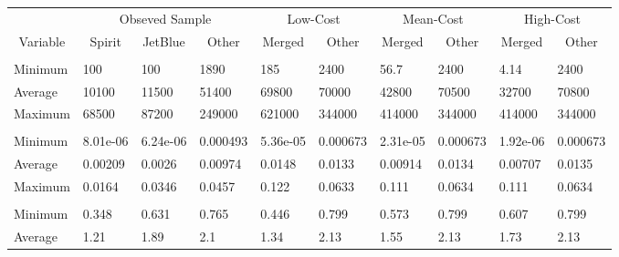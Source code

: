
\begin{tabular}[t]{llllllllll}
\toprule
\multicolumn{1}{c}{ } & \multicolumn{3}{c}{Obseved Sample} & \multicolumn{2}{c}{Low-Cost} & \multicolumn{2}{c}{Mean-Cost} & \multicolumn{2}{c}{High-Cost} \\
\cmidrule(l{3pt}r{3pt}){2-4} \cmidrule(l{3pt}r{3pt}){5-6} \cmidrule(l{3pt}r{3pt}){7-8} \cmidrule(l{3pt}r{3pt}){9-10}
\multicolumn{1}{c}{Variable} & \multicolumn{1}{c}{Spirit} & \multicolumn{1}{c}{JetBlue} & \multicolumn{1}{c}{Other} & \multicolumn{1}{c}{Merged} & \multicolumn{1}{c}{Other} & \multicolumn{1}{c}{Merged} & \multicolumn{1}{c}{Other} & \multicolumn{1}{c}{Merged} & \multicolumn{1}{c}{Other} \\
\cmidrule(l{3pt}r{3pt}){1-1} \cmidrule(l{3pt}r{3pt}){2-2} \cmidrule(l{3pt}r{3pt}){3-3} \cmidrule(l{3pt}r{3pt}){4-4} \cmidrule(l{3pt}r{3pt}){5-5} \cmidrule(l{3pt}r{3pt}){6-6} \cmidrule(l{3pt}r{3pt}){7-7} \cmidrule(l{3pt}r{3pt}){8-8} \cmidrule(l{3pt}r{3pt}){9-9} \cmidrule(l{3pt}r{3pt}){10-10}
\addlinespace[0.3em]
\multicolumn{10}{l}{\textbf{Passengers}}\\
\hspace{1em}Minimum & 100 & 100 & 1890 & 185 & 2400 & 56.7 & 2400 & 4.14 & 2400\\
\hspace{1em}Average & 10100 & 11500 & 51400 & 69800 & 70000 & 42800 & 70500 & 32700 & 70800\\
\hspace{1em}Maximum & 68500 & 87200 & 249000 & 621000 & 344000 & 414000 & 344000 & 414000 & 344000\\
\addlinespace[0.3em]
\multicolumn{10}{l}{\textbf{Market Share}}\\
\hspace{1em}Minimum & 8.01e-06 & 6.24e-06 & 0.000493 & 5.36e-05 & 0.000673 & 2.31e-05 & 0.000673 & 1.92e-06 & 0.000673\\
\hspace{1em}Average & 0.00209 & 0.0026 & 0.00974 & 0.0148 & 0.0133 & 0.00914 & 0.0134 & 0.00707 & 0.0135\\
\hspace{1em}Maximum & 0.0164 & 0.0346 & 0.0457 & 0.122 & 0.0633 & 0.111 & 0.0634 & 0.111 & 0.0634\\
\addlinespace[0.3em]
\multicolumn{10}{l}{\textbf{Prices}}\\
\hspace{1em}Minimum & 0.348 & 0.631 & 0.765 & 0.446 & 0.799 & 0.573 & 0.799 & 0.607 & 0.799\\
\hspace{1em}Average & 1.21 & 1.89 & 2.1 & 1.34 & 2.13 & 1.55 & 2.13 & 1.73 & 2.13\\

\end{tabular}
